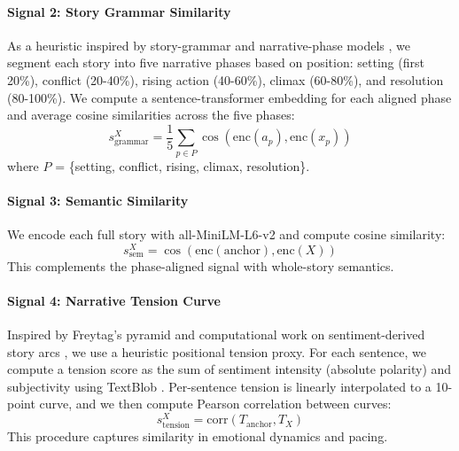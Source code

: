 \documentclass[11pt]{article}
\begin{document}
\paragraph{Signal 2: Story Grammar Similarity}
As a heuristic inspired by story-grammar and narrative-phase models \citep{propp1968morphology,freytag1894technik,thorndyke1977storygrammar}, we segment each story into five narrative phases based on position: setting (first 20\%), conflict (20-40\%), rising action (40-60\%), climax (60-80\%), and resolution (80-100\%). We compute a sentence-transformer embedding for each aligned phase and average cosine similarities across the five phases:
\begin{equation}
s_{\text{grammar}}^X = \frac{1}{5}\sum_{p \in P} \cos(\text{enc}(a_p), \text{enc}(x_p))
\end{equation}
where $P$ = \{setting, conflict, rising, climax, resolution\}.

\paragraph{Signal 3: Semantic Similarity}
We encode each full story with all-MiniLM-L6-v2 \citep{reimers2019sentence,reimers2020allminilm} and compute cosine similarity:
\begin{equation}
s_{\text{sem}}^X = \cos(\text{enc}(\text{anchor}), \text{enc}(X))
\end{equation}
This complements the phase-aligned signal with whole-story semantics.

\paragraph{Signal 4: Narrative Tension Curve}
Inspired by Freytag's pyramid \citep{freytag1894technik} and computational work on sentiment-derived story arcs \citep{reagan2016emotionalarcs}, we use a heuristic positional tension proxy. For each sentence, we compute a tension score as the sum of sentiment intensity (absolute polarity) and subjectivity using TextBlob \citep{loria2018textblob}. Per-sentence tension is linearly interpolated to a 10-point curve, and we then compute Pearson correlation between curves:
\begin{equation}
s_{\text{tension}}^X = \text{corr}(T_{\text{anchor}}, T_X)
\end{equation}
This procedure captures similarity in emotional dynamics and pacing.
\end{document}
